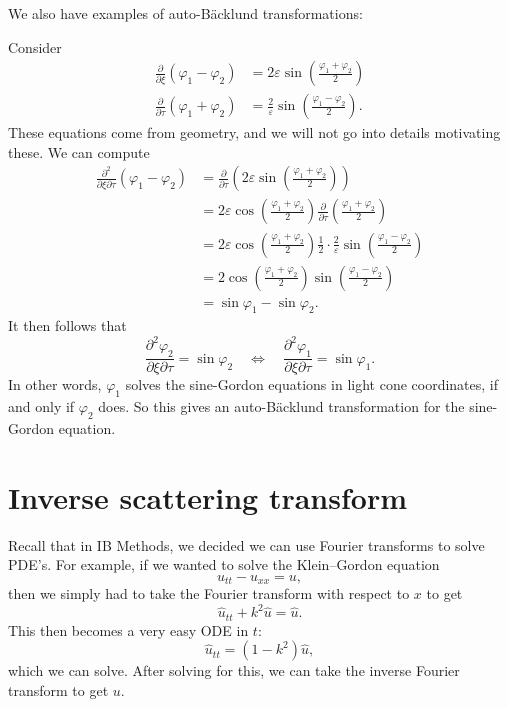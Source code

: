 \documentclass[a4paper]{article}
\begin{document}
We also have examples of auto-B\"acklund transformations:
\begin{eg}
  Consider
  \begin{align*}
    \frac{\partial}{\partial \xi}(\varphi_1 - \varphi_2) &= 2 \varepsilon \sin \left(\frac{\varphi_1 + \varphi_2}{2}\right)\\
    \frac{\partial}{\partial \tau}(\varphi_1 + \varphi_2) &= \frac{2}{\varepsilon} \sin\left(\frac{\varphi_1 - \varphi_2}{2}\right).
  \end{align*}
  These equations come from geometry, and we will not go into details motivating these. We can compute
  \begin{align*}
    \frac{\partial^2}{\partial \xi\partial \tau} (\varphi_1 - \varphi_2) &= \frac{\partial}{\partial \tau}\left(2\varepsilon \sin \left(\frac{\varphi_1 + \varphi_2}{2}\right)\right)\\
    &= 2\varepsilon \cos \left(\frac{\varphi_1 + \varphi_2}{2}\right)\frac{\partial}{\partial \tau}\left(\frac{\varphi_1 + \varphi_2}{2}\right)\\
    &= 2 \varepsilon \cos \left(\frac{\varphi_1 + \varphi_2}{2}\right) \frac{1}{2} \cdot \frac{2}{\varepsilon} \sin \left(\frac{\varphi_1 - \varphi_2}{2}\right)\\
    &= 2 \cos \left(\frac{\varphi_1 + \varphi_2}{2}\right)\sin \left(\frac{\varphi_1 - \varphi_2}{2}\right)\\
    &= \sin \varphi_1 - \sin \varphi_2.
  \end{align*}
  It then follows that
  \[
    \frac{\partial^2 \varphi_2}{\partial \xi \partial \tau} = \sin \varphi_2\quad\Longleftrightarrow\quad \frac{\partial^2 \varphi_1}{\partial \xi \partial \tau} = \sin \varphi_1.
  \]
  In other words, $\varphi_1$ solves the sine-Gordon equations in light cone coordinates, if and only if $\varphi_2$ does. So this gives an auto-B\"acklund transformation for the sine-Gordon equation.
\end{eg}


\section{Inverse scattering transform}
Recall that in IB Methods, we decided we can use Fourier transforms to solve PDE's. For example, if we wanted to solve the Klein--Gordon equation
\[
  u_{tt} - u_{xx} = u,
\]
then we simply had to take the Fourier transform with respect to $x$ to get
\[
  \hat{u}_{tt} + k^2 \hat{u} = \hat{u}.
\]
This then becomes a very easy ODE in $t$:
\[
  \hat{u}_{tt} = (1 - k^2) \hat{u},
\]
which we can solve. After solving for this, we can take the inverse Fourier transform to get $u$.
\end{document}
